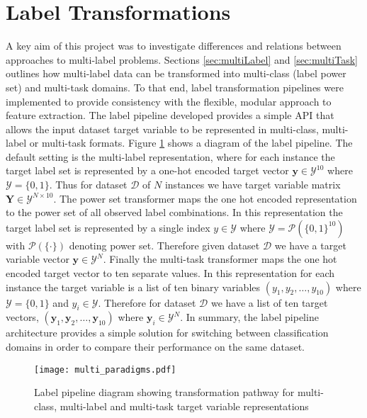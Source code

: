 \documentclass[Dissertation.tex]{subfiles}
\begin{document}
\section{Label Transformations}
A key aim of this project was to investigate differences and relations between approaches to multi-label problems. Sections \ref{sec:multiLabel} and \ref{sec:multiTask} outlines how multi-label data can be transformed into multi-class (label power set) and multi-task domains. To that end, label transformation pipelines were implemented to provide consistency with the flexible, modular approach to feature extraction. The label pipeline developed provides a simple API that allows the input dataset target variable to be represented in multi-class, multi-label or multi-task formats. Figure \ref{fig:labelPipe} shows a diagram of the label pipeline. The default setting is the multi-label representation, where for each instance the target label set is represented by a one-hot encoded target vector $\mathbf{y} \in \mathcal{Y}^{10}$ where $ \mathcal{Y} = \{0,1\} $. Thus for dataset $ \mathcal{D} $ of $ N $ instances we have target variable matrix $ \mathbf{Y} \in \mathcal{Y}^{N\times10}$. The power set transformer maps the one hot encoded representation to the power set of all observed label combinations. In this representation the target label set is represented by a single index $ y \in \mathcal{Y} $ where $\mathcal{Y} = \mathcal{P}(\{0,1\}^{10})  $ with $\mathcal{P}(\{\cdot\})$ denoting power set. Therefore given dataset $ \mathcal{D} $ we have a target variable vector $ \mathbf{y} \in \mathcal{Y}^N$. Finally the multi-task transformer maps the one hot encoded  target vector to ten separate values. In this representation for each instance the target variable is a list of ten binary variables $ (y_1, y_2, \dots,y_{10} ) $ where $ \mathcal{Y} = \{0,1\} $ and $ y_i \in \mathcal{Y}$. Therefore for dataset $\mathcal{D}$ we have a list of ten target vectors, $ (\mathbf{y}_1,\mathbf{y}_2, \dots, \mathbf{y}_{10}) $ where $ \mathbf{y}_i \in \mathcal{Y}^N $. In summary, the label pipeline architecture provides a simple solution for switching between classification domains in order to compare their performance on the same dataset.
	
\begin{figure}

	\texttt{[image: multi\_paradigms.pdf]}
	\caption{Label pipeline diagram showing transformation pathway for multi-class, multi-label and multi-task target variable representations}
	\label{fig:labelPipe}
\end{figure}
\end{document}
